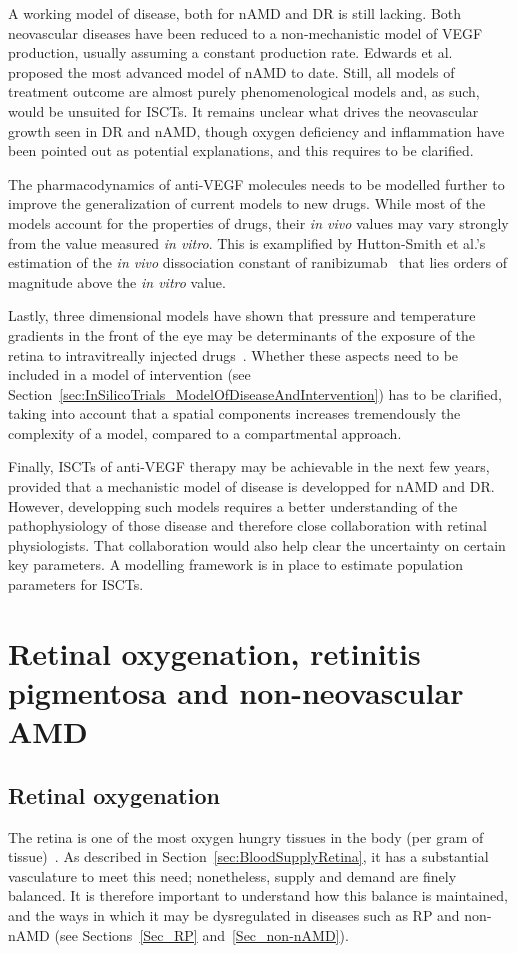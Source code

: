 \documentclass{article}
\begin{document}
A working model of disease, both for nAMD and DR is still lacking.
Both neovascular diseases have been reduced to a non-mechanistic model of VEGF production, usually assuming a constant production rate.
Edwards et al.~\cite{Edwards_2020} proposed the most advanced model of nAMD to date.
Still, all models of treatment outcome are almost purely phenomenological models and, as such, would be unsuited for ISCTs.
It remains unclear what drives the neovascular growth seen in DR and nAMD, though oxygen deficiency and inflammation have been pointed out as potential explanations, and this requires to be clarified.

The pharmacodynamics of anti-VEGF molecules needs to be modelled further to improve the generalization of current models to new drugs.
While most of the models account for the properties of drugs, their \textit{in vivo} values may vary strongly from the value measured \textit{in vitro}.
This is examplified by Hutton-Smith et al.'s estimation of the \textit{in vivo} dissociation constant of ranibizumab~\cite{HuttonSmith_2016} that lies orders of magnitude above the \textit{in vitro} value.

Lastly, three dimensional models have shown that pressure and temperature gradients in the front of the eye may be determinants of the exposure of the retina to intravitreally injected drugs~\cite{Missel_2012,Zhang_2018,Lamminsalo_2018,Edwards_2020}.
Whether these aspects need to be included in a model of intervention (see Section~\ref{sec:InSilicoTrials_ModelOfDiseaseAndIntervention}) has to be clarified, taking into account that a spatial components increases tremendously the complexity of a model, compared to a compartmental approach.

Finally, ISCTs of anti-VEGF therapy may be achievable in the next few years, provided that a mechanistic model of disease is developped for nAMD and DR.
However, developping such models requires a better understanding of the pathophysiology of those disease and therefore close collaboration with retinal physiologists.
That collaboration would also help clear the uncertainty on certain key parameters.
A modelling framework is in place to estimate population parameters for ISCTs.

\section{Retinal oxygenation, retinitis pigmentosa and non-neovascular AMD}\label{Sec_Ox_RP_non-nAMD}
%
%
\subsection{Retinal oxygenation}\label{Sec_Oxygen}
%
The retina is one of the most oxygen hungry tissues in the body (per gram of tissue)~\cite{Anderson_1968,Anderson_and_Saltzman_1964,Yu_and_Cringle_2001,W-Wirawan_and_Linsenmeier_2003}. As described in Section~\ref{sec:BloodSupplyRetina}, it has a substantial vasculature to meet this need; nonetheless, supply and demand are finely balanced. It is therefore important to understand how this balance is maintained, and the ways in which it may be dysregulated in diseases such as RP and non-nAMD (see Sections~\ref{Sec_RP} and~\ref{Sec_non-nAMD}).
\end{document}
